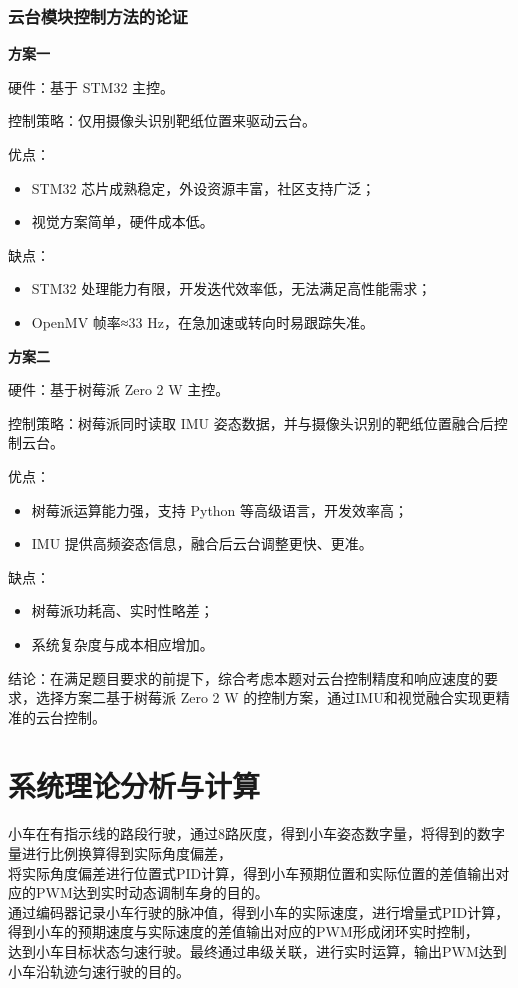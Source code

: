 \documentclass[UTF-8,zihao=-4]{ctexart}
\begin{document}
\subsubsection{云台模块控制方法的论证}
    \textbf{方案一}
    
    硬件：基于 STM32 主控。
    
    控制策略：仅用摄像头识别靶纸位置来驱动云台。
    
    优点：
    \begin{itemize}
        \item STM32 芯片成熟稳定，外设资源丰富，社区支持广泛；
        \item 视觉方案简单，硬件成本低。
    \end{itemize}
    
    缺点：
    \begin{itemize}
        \item STM32 处理能力有限，开发迭代效率低，无法满足高性能需求；
        \item OpenMV 帧率≈33 Hz，在急加速或转向时易跟踪失准。
    \end{itemize}
    
    \textbf{方案二}
    
    硬件：基于树莓派 Zero 2 W 主控。
    
    控制策略：树莓派同时读取 IMU 姿态数据，并与摄像头识别的靶纸位置融合后控制云台。
    
    优点：
    \begin{itemize}
        \item 树莓派运算能力强，支持 Python 等高级语言，开发效率高；
        \item IMU 提供高频姿态信息，融合后云台调整更快、更准。
    \end{itemize}
    
    缺点：
    \begin{itemize}
        \item 树莓派功耗高、实时性略差；
        \item 系统复杂度与成本相应增加。
    \end{itemize}
    
    结论：在满足题目要求的前提下，综合考虑本题对云台控制精度和响应速度的要求，选择方案二基于树莓派 Zero 2 W 的控制方案，通过IMU和视觉融合实现更精准的云台控制。

\section{系统理论分析与计算}
        小车在有指示线的路段行驶，通过8路灰度，得到小车姿态数字量，将得到的数字量进行比例换算得到实际角度偏差，
        \\将实际角度偏差进行位置式PID计算，得到小车预期位置和实际位置的差值输出对应的PWM达到实时动态调制车身的目的。
        \\通过编码器记录小车行驶的脉冲值，得到小车的实际速度，进行增量式PID计算，得到小车的预期速度与实际速度的差值输出对应的PWM形成闭环实时控制，
        \\达到小车目标状态匀速行驶。最终通过串级关联，进行实时运算，输出PWM达到小车沿轨迹匀速行驶的目的。
\end{document}
